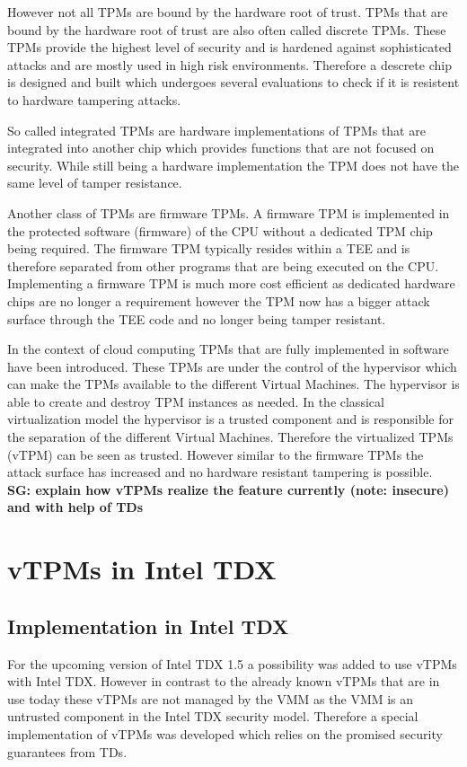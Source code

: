 \documentclass[sigplan,screen,nonacm]{acmart}
\newcommand{\sg}[1]{\textbf{SG: #1}}
\begin{document}
However not all TPMs are bound by the hardware root of trust.
TPMs that are bound by the hardware root of trust are also often called discrete TPMs.
These TPMs provide the highest level of security and is hardened against sophisticated attacks and are mostly used in high risk environments.
Therefore a descrete chip is designed and built which undergoes several evaluations to check if it is resistent to hardware tampering attacks\cite{TPM-short}.

So called integrated TPMs are hardware implementations of TPMs that are integrated into another chip which provides functions that are not focused on security.
While still being a hardware implementation the TPM does not have the same level of tamper resistance\cite{TPM-short}.

Another class of TPMs are firmware TPMs.
A firmware TPM is implemented in the protected software (firmware) of the CPU without a dedicated TPM chip being required.
The firmware TPM typically resides within a TEE and is therefore separated from other programs that are being executed on the CPU.
Implementing a firmware TPM is much more cost efficient as dedicated hardware chips are no longer a requirement however the TPM now has a bigger attack surface through the TEE code and no longer being tamper resistant\cite{TPM-short}.

In the context of cloud computing TPMs that are fully implemented in software have been introduced.
These TPMs are under the control of the hypervisor which can make the TPMs available to the different Virtual Machines.
The hypervisor is able to create and destroy TPM instances as needed.
In the classical virtualization model the hypervisor is a trusted component and is responsible for the separation of the different Virtual Machines.
Therefore the virtualized TPMs (vTPM) can be seen as trusted.
However similar to the firmware TPMs the attack surface has increased and no hardware resistant tampering is possible\cite{perez2006vtpm}\cite{vTPM-google}.
\sg{explain how vTPMs realize the feature currently (note: insecure) and with help of TDs}



\section{vTPMs in Intel TDX}
\label{chap:vTPMTDX}

\subsection{Implementation in Intel TDX}
For the upcoming version of Intel TDX 1.5 a possibility was added to use vTPMs with Intel TDX.
However in contrast to the already known vTPMs that are in use today these vTPMs are not managed by the VMM as the VMM is an untrusted component in the Intel TDX security model.
Therefore a special implementation of vTPMs was developed which relies on the promised security guarantees from TDs.
\end{document}
